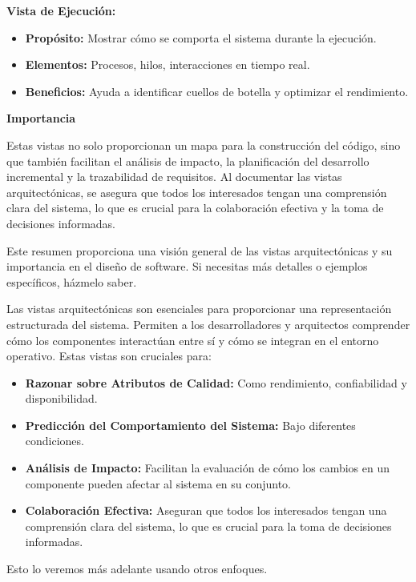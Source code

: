 \textbf{Vista de Ejecución:}
\begin{itemize}
    \item \textbf{Propósito:} Mostrar cómo se comporta el sistema durante la ejecución.
    \item \textbf{Elementos:} Procesos, hilos, interacciones en tiempo real.
    \item \textbf{Beneficios:} Ayuda a identificar cuellos de botella y optimizar el rendimiento.
\end{itemize}

\textbf{Importancia}

Estas vistas no solo proporcionan un mapa para la construcción del código, sino que también facilitan el análisis de impacto, la planificación del desarrollo incremental y la trazabilidad de requisitos. Al documentar las vistas arquitectónicas, se asegura que todos los interesados tengan una comprensión clara del sistema, lo que es crucial para la colaboración efectiva y la toma de decisiones informadas.

Este resumen proporciona una visión general de las vistas arquitectónicas y su importancia en el diseño de software. Si necesitas más detalles o ejemplos específicos, házmelo saber.


Las vistas arquitectónicas son esenciales para proporcionar una representación estructurada del sistema. Permiten a los desarrolladores y arquitectos comprender cómo los componentes interactúan entre sí y cómo se integran en el entorno operativo. Estas vistas son cruciales para:
\begin{itemize}
    \item \textbf{Razonar sobre Atributos de Calidad:} Como rendimiento, confiabilidad y disponibilidad.
    \item \textbf{Predicción del Comportamiento del Sistema:} Bajo diferentes condiciones.
    \item \textbf{Análisis de Impacto:} Facilitan la evaluación de cómo los cambios en un componente pueden afectar al sistema en su conjunto.
    \item \textbf{Colaboración Efectiva:} Aseguran que todos los interesados tengan una comprensión clara del sistema, lo que es crucial para la toma de decisiones informadas.
\end{itemize}




Esto lo veremos más adelante usando otros enfoques. 

